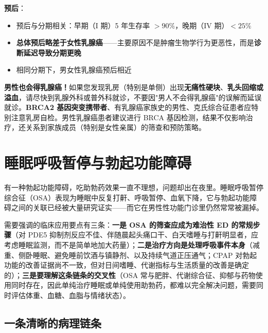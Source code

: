 \vspace{0.5em}
\noindent\textbf{预后}：

\begin{itemize}[leftmargin=2cm]
	\item 预后与分期相关：早期（I 期）5 年生存率 $>90\%$，晚期（IV 期）$<25\%$
	\item \textbf{总体预后略差于女性乳腺癌}——主要原因不是肿瘤生物学行为更恶性，而是\textbf{诊断延迟导致分期更晚}
	\item 相同分期下，男女性乳腺癌预后相近
\end{itemize}

\begin{tcolorbox}[colback=pink!5!white,colframe=red!50!black,title=贴心小叮咛]
\textbf{男性也会得乳腺癌！}如果您发现乳房（特别是单侧）出现\textbf{无痛性硬块}、\textbf{乳头回缩或溢血}，请尽快到乳腺外科或普外科就诊，不要因"男人不会得乳腺癌"的误解而延误就诊。\textbf{BRCA2 基因突变携带者}、有乳腺癌家族史的男性、克氏综合征患者应特别注意乳房自检。男性乳腺癌患者建议进行 BRCA 基因检测，结果不仅影响治疗，还关系到家族成员（特别是女性亲属）的筛查和预防策略。
\end{tcolorbox}


\section{睡眠呼吸暂停与勃起功能障碍}

有一种勃起功能障碍，吃助勃药效果一直不理想，问题却出在夜里。睡眠呼吸暂停综合征（OSA）表现为睡眠中反复打鼾、呼吸暂停、血氧下降，它与勃起功能障碍之间的关联已经被大量研究证实——而它在男性性功能门诊里仍然常常被漏掉。


需要强调的临床应用要点有三条：\textbf{一是 OSA 的筛查应成为难治性 ED 的常规步骤}（对 PDE5 抑制剂反应不佳、伴随晨起头痛口干、白天嗜睡与打鼾明显者，应考虑睡眠监测，而不是简单地加大药量）；\textbf{二是治疗方向是处理呼吸事件本身}（减重、侧卧睡眠、避免睡前饮酒与镇静剂、以及持续气道正压通气；CPAP 对勃起功能的改善证据尚不一致，但对日间嗜睡、代谢指标与生活质量的改善是确定的）；\textbf{三是要理解这条链条的交叉性}（OSA 常与肥胖、代谢综合征、抑郁与药物使用同时存在，因此单纯治疗睡眠或单纯使用助勃药，都难以完全解决问题，需要同时评估体重、血糖、血脂与情绪状态）。

\subsection{一条清晰的病理链条}

